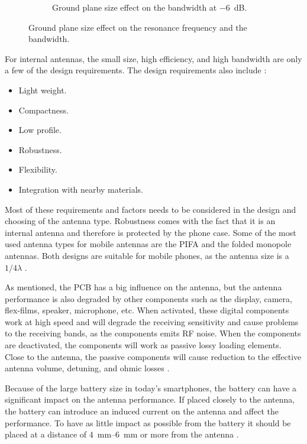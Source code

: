 \begin{figure}[htbp]
\begin{subfigure}[b]{0.49\linewidth}
        \caption{Ground plane size effect on the bandwidth at \SI{-6}{dB}.}
    \end{subfigure}
    \caption{Ground plane size effect on the resonance frequency and the bandwidth\cite{sanchez2008multiband}.}
    \label{fig:antenna_pcb_behavior}
\end{figure}

For internal antennas, the small size, high efficiency, and high bandwidth are only a few of the design requirements. The design requirements also include \cite{fujimoto2008mobile}:
\begin{itemize}
\item Light weight.
\item Compactness.
\item Low profile.
\item Robustness.
\item Flexibility.
\item Integration with nearby materials.
\end{itemize}
Most of these requirements and factors needs to be considered in the design and choosing of the antenna type. Robustness comes with the fact that it is an internal antenna and therefore is protected by the phone case. Some of the most used antenna types for mobile antennas are the PIFA and the folded monopole antennas. Both designs are suitable for mobile phones, as the antenna size is a $1/4 \lambda$ \cite{fujimoto2008mobile}.

As mentioned, the PCB has a big influence on the antenna, but the antenna performance is also degraded by other components such as the display, camera, flex-films, speaker, microphone, etc. When activated, these digital components work at high speed and will degrade the receiving sensitivity and cause problems to the receiving bands, as the components emits RF noise. When the components are deactivated, the components will work as passive lossy loading elements. Close to the antenna, the passive components will cause reduction to the effective antenna volume, detuning, and ohmic losses \cite{fujimoto2008mobile}.

Because of the large battery size in today's smartphones, the battery can have a significant impact on the antenna performance. If placed closely to the antenna, the battery can introduce an induced current on the antenna and affect the performance. To have as little impact as possible from the battery it should be placed at a distance of \SIrange{4}{6}{mm} or more from the antenna \cite{fujimoto2008mobile}. 

